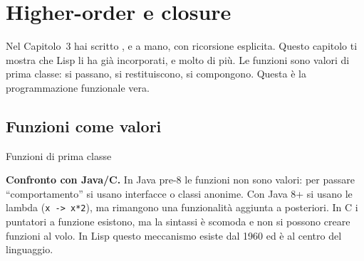
\chapter{Higher-order e closure}

\begin{intuizione}
Nel Capitolo~3 hai scritto ,  e 
a mano, con ricorsione esplicita.
Questo capitolo ti mostra che Lisp li ha già incorporati,
e molto di più.
Le funzioni sono valori di prima classe: si passano, si restituiscono,
si compongono. Questa è la programmazione funzionale vera.
\end{intuizione}

\vspace{4pt}

\section{Funzioni come valori}

\begin{concetto}{Funzioni di prima classe}

\boxsep
{}
\end{concetto}

\begin{confronto}
\textbf{Confronto con Java/C.}
In Java pre-8 le funzioni non sono valori: per passare ``comportamento''
si usano interfacce o classi anonime. Con Java 8+ si usano le lambda
(\texttt{x -> x*2}), ma rimangono una funzionalità aggiunta a posteriori.
In C i puntatori a funzione esistono, ma la sintassi è scomoda e
non si possono creare funzioni al volo.
In Lisp questo meccanismo esiste dal 1960 ed è al centro del linguaggio.
\end{confronto}

